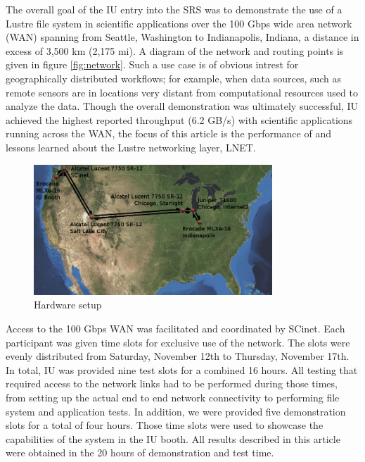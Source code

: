 \documentclass[]{sigplan-proc}
\begin{document}
The overall goal of the IU entry into the SRS was to demonstrate the use of a Lustre file system in scientific
applications over the 100 Gbps wide area network (WAN) spanning from Seattle, Washington to Indianapolis,
Indiana, a distance in excess of 3,500 km (2,175 mi). A diagram of the network and routing points is given in
figure \ref{fig:network}. Such a use case is of obvious intrest for geographically distributed workflows; for
example, when data sources, such as remote sensors are in locations very distant from computational resources
used to analyze the data. Though the overall demonstration was ultimately successful, IU achieved the highest
reported throughput (6.2 GB/s) with scientific applications running across the WAN, the focus of this article
is the performance of and lessons learned about the Lustre networking layer, LNET.

\begin{figure}[t]
\begin{center}
\includegraphics[width=0.80\textwidth]{figures/network.png}
\caption{Hardware setup}
\label{fig:hardwaresetup}
\end{center}
\end{figure}

Access to the 100 Gbps WAN was facilitated and coordinated by SCinet. Each participant was given time slots
for exclusive use of the network. The slots were evenly distributed from Saturday, November 12th to Thursday,
November 17th. In total, IU was provided nine test slots for a combined 16 hours. All testing that required
access to the network links had to be performed during those times, from setting up the actual end to end
network connectivity to performing file system and application tests. In addition, we were provided five
demonstration slots for a total of four hours. Those time slots were used to showcase the capabilities of the
system in the IU booth. All results described in this article were obtained in the 20 hours of demonstration
and test time.
\end{document}
